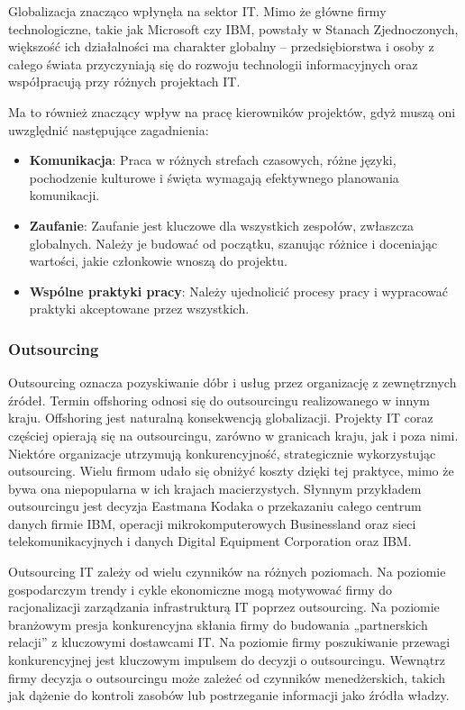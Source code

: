 Globalizacja znacząco wpłynęła na sektor IT. Mimo że główne firmy technologiczne, takie jak Microsoft czy IBM, powstały w Stanach Zjednoczonych, większość ich działalności ma charakter globalny – przedsiębiorstwa i osoby z całego świata przyczyniają się do rozwoju technologii informacyjnych oraz współpracują przy różnych projektach IT. \autocite{ITPM}

Ma to również znaczący wpływ na pracę kierowników projektów, gdyż muszą oni uwzględnić następujące zagadnienia:

\begin{itemize}
  \item \textbf{Komunikacja}:  
  Praca w różnych strefach czasowych, różne języki, pochodzenie kulturowe i święta wymagają efektywnego planowania komunikacji.
  \item \textbf{Zaufanie}:  
  Zaufanie jest kluczowe dla wszystkich zespołów, zwłaszcza globalnych. Należy je budować od początku, szanując różnice i doceniając wartości, jakie członkowie wnoszą do projektu.
  \item \textbf{Wspólne praktyki pracy}:  
  Należy ujednolicić procesy pracy i wypracować praktyki akceptowane przez wszystkich. \autocite{ITPM}
\end{itemize}

\subsubsection{Outsourcing}
Outsourcing oznacza pozyskiwanie dóbr i usług przez organizację z zewnętrznych źródeł. Termin offshoring odnosi się do outsourcingu realizowanego w innym kraju. Offshoring jest naturalną konsekwencją globalizacji. Projekty IT coraz częściej opierają się na outsourcingu, zarówno w granicach kraju, jak i poza nimi. Niektóre organizacje utrzymują konkurencyjność, strategicznie wykorzystując outsourcing. Wielu firmom udało się obniżyć koszty dzięki tej praktyce, mimo że bywa ona niepopularna w ich krajach macierzystych. \autocite{ITPM} Słynnym przykładem outsourcingu jest decyzja Eastmana Kodaka o przekazaniu całego centrum danych firmie IBM, operacji mikrokomputerowych Businessland oraz sieci telekomunikacyjnych i danych Digital Equipment Corporation oraz IBM.

Outsourcing IT zależy od wielu czynników na różnych poziomach. Na poziomie gospodarczym trendy i cykle ekonomiczne mogą motywować firmy do racjonalizacji zarządzania infrastrukturą IT poprzez outsourcing. Na poziomie branżowym presja konkurencyjna skłania firmy do budowania „partnerskich relacji” z kluczowymi dostawcami IT. Na poziomie firmy poszukiwanie przewagi konkurencyjnej jest kluczowym impulsem do decyzji o outsourcingu. Wewnątrz firmy decyzja o outsourcingu może zależeć od czynników menedżerskich, takich jak dążenie do kontroli zasobów lub postrzeganie informacji jako źródła władzy. \autocite{loh1992determinants}\autocite{Kanter1979}\autocite{Mintzberg1983}


